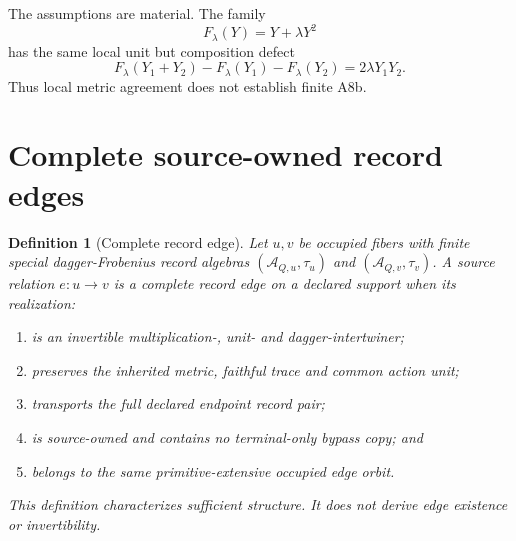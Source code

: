 \documentclass[11pt]{article}
\newtheorem{definition}{Definition}
\begin{document}
The assumptions are material.  The family
\begin{equation}
 F_\lambda(Y)=Y+\lambda Y^2
 \label{eq:nonlinear-countermodel}
\end{equation}
has the same local unit but composition defect
\begin{equation}
 F_\lambda(Y_1+Y_2)-F_\lambda(Y_1)-F_\lambda(Y_2)
 =2\lambda Y_1Y_2.
 \label{eq:nonlinear-defect}
\end{equation}
Thus local metric agreement does not establish finite A8b.

\section{Complete source-owned record edges}

\begin{definition}[Complete record edge]
Let \(u,v\) be occupied fibers with finite special dagger-Frobenius record
algebras \((\mathcal A_{Q,u},\tau_u)\) and
\((\mathcal A_{Q,v},\tau_v)\).  A source relation \(e:u\to v\) is a complete
record edge on a declared support when its realization:
\begin{enumerate}[label=(E\arabic*)]
 \item is an invertible multiplication-, unit- and dagger-intertwiner;
 \item preserves the inherited metric, faithful trace and common action unit;
 \item transports the full declared endpoint record pair;
 \item is source-owned and contains no terminal-only bypass copy; and
 \item belongs to the same primitive-extensive occupied edge orbit.
\end{enumerate}
This definition characterizes sufficient structure.  It does not derive edge
existence or invertibility.
\end{definition}
\end{document}
